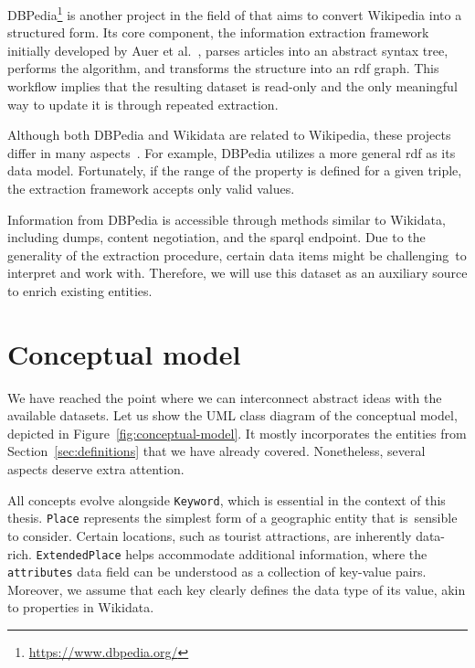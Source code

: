 
DBPedia\footnote{\href{https://www.dbpedia.org/}{https://www.dbpedia.org/}} is another project in the field of \emph{} that aims to convert Wikipedia into a structured form. Its core component, the information extraction framework initially developed by Auer et al.~\cite{auer07}, parses articles into an abstract syntax tree, performs the algorithm, and transforms the structure into an \acs{rdf} graph. This workflow implies that the resulting dataset is read-only and the only meaningful way to update it is through repeated extraction.

Although both DBPedia and Wikidata are related to Wikipedia, these projects differ in many aspects~\cite{ismayilov18}. For example, DBPedia utilizes a more general \acs{rdf} as its data model. Fortunately, if the range of the property is defined for a given triple, the extraction framework accepts only valid values.

Information from DBPedia is accessible through methods similar to Wikidata, including dumps, content negotiation, and the \acs{sparql} endpoint. Due to the generality of the extraction procedure, certain data items might be challenging~to interpret and work with. Therefore, we will use this dataset as an auxiliary source to enrich existing entities.

\section{Conceptual model}\label{sec:conceptual-model}

We have reached the point where we can interconnect abstract ideas with the available datasets. Let us show the UML class diagram of the conceptual model, depicted in Figure~\ref{fig:conceptual-model}. It mostly incorporates the entities from Section~\ref{sec:definitions} that we have already covered. Nonetheless, several aspects deserve extra attention.

All concepts evolve alongside \texttt{Keyword}, which is essential in the context of this thesis. \texttt{Place} represents the simplest form of a geographic entity that is~sen\-si\-ble to consider. Certain locations, such as tourist at\-trac\-tions, are inherently data-rich. \texttt{ExtendedPlace} helps accommodate additional information, where the \texttt{attributes} data field can be understood as a collection of key-value pairs. Moreover, we assume that each key clearly defines the data type of its value, akin to properties in Wikidata.

